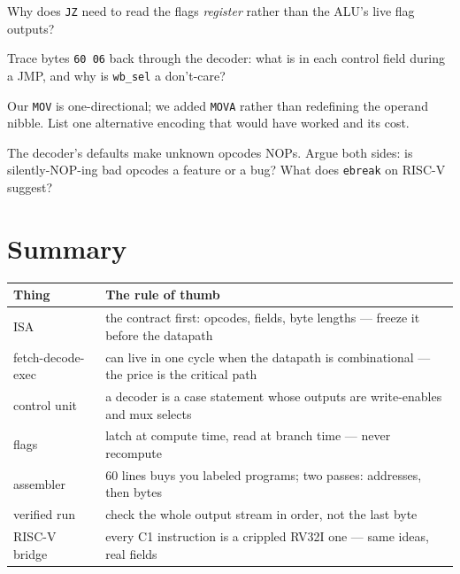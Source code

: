 \begin{exercise}[easy]
Why does \texttt{JZ} need to read the flags \emph{register} rather
than the ALU's live flag outputs?
\end{exercise}
\begin{exercise}[medium]
Trace bytes \texttt{60 06} back through the decoder: what is in each
control field during a JMP, and why is \texttt{wb\_sel} a don't-care?
\end{exercise}
\begin{exercise}[medium]
Our \texttt{MOV} is one-directional; we added \texttt{MOVA} rather
than redefining the operand nibble. List one alternative encoding
that would have worked and its cost.
\end{exercise}
\begin{exercise}[hard]
The decoder's defaults make unknown opcodes NOPs. Argue both sides:
is silently-NOP-ing bad opcodes a feature or a bug? What does
\texttt{ebreak} on RISC-V suggest?
\end{exercise}

\section{Summary}\label{sec:sum16}

\begin{center}
\begin{tabularx}{\linewidth}{@{}lX@{}}
\toprule
\textbf{Thing} & \textbf{The rule of thumb}\\
\midrule
ISA & the contract first: opcodes, fields, byte lengths --- freeze it
before the datapath\\
fetch-decode-exec & can live in one cycle when the datapath is
combinational --- the price is the critical path\\
control unit & a decoder is a case statement whose outputs are
write-enables and mux selects\\
flags & latch at compute time, read at branch time --- never recompute\\
assembler & 60 lines buys you labeled programs; two passes: addresses,
then bytes\\
verified run & check the whole output stream in order, not the last
byte\\
RISC-V bridge & every C1 instruction is a crippled RV32I one --- same
ideas, real fields\\
\bottomrule
\end{tabularx}
\end{center}

